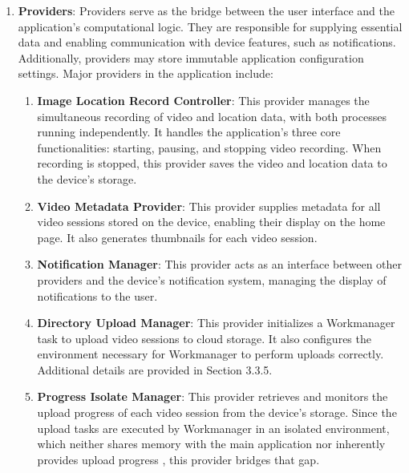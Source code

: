 \begin{enumerate}
    \item \textbf{Providers}: Providers serve as the bridge between the user interface and the application's computational logic. They are responsible for supplying essential data and enabling communication with device features, such as notifications. Additionally, providers may store immutable application configuration settings. Major providers in the application include:
    \begin{enumerate}
        \item \textbf{Image Location Record Controller}: This provider manages the simultaneous recording of video and location data, with both processes running independently. It handles the application's three core functionalities: starting, pausing, and stopping video recording. When recording is stopped, this provider saves the video and location data to the device's storage.
        \item \textbf{Video Metadata Provider}: This provider supplies metadata for all video sessions stored on the device, enabling their display on the home page. It also generates thumbnails for each video session.  
        \item \textbf{Notification Manager}: This provider acts as an interface between other providers and the device's notification system, managing the display of notifications to the user.  
        \item \textbf{Directory Upload Manager}: This provider initializes a Workmanager task to upload video sessions to cloud storage. It also configures the environment necessary for Workmanager to perform uploads correctly. Additional details are provided in Section 3.3.5. %
        \item \textbf{Progress Isolate Manager}: This provider retrieves and monitors the upload progress of each video session from the device's storage. Since the upload tasks are executed by Workmanager in an isolated environment, which neither shares memory with the main application nor inherently provides upload progress \cite{workmanager-doc}, this provider bridges that gap.
    \end{enumerate}
    

\end{enumerate}
